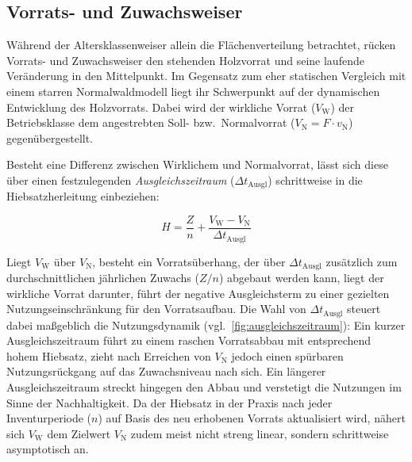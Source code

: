 \documentclass[twocolumn, paper=a4, fontsize=10pt]{scrartcl}
\begin{document}
\subsection{Vorrats- und Zuwachsweiser}

Während der Altersklassenweiser allein die Flächenverteilung betrachtet, rücken Vorrats- und Zuwachsweiser den stehenden Holzvorrat und seine laufende Veränderung in den Mittelpunkt. Im Gegensatz zum eher statischen Vergleich mit einem starren Normalwaldmodell liegt ihr Schwerpunkt auf der dynamischen Entwicklung des Holzvorrats. Dabei wird der wirkliche Vorrat ($V_{\text{W}}$) der Betriebsklasse dem angestrebten Soll- bzw.\ Normalvorrat ($V_{\text{N}} = F \cdot v_{\text{N}}$) gegenübergestellt.

Besteht eine Differenz zwischen Wirklichem und Normalvorrat, lässt sich diese über einen festzulegenden \emph{Ausgleichszeitraum} ($\Delta t_{\text{Ausgl}}$) schrittweise in die Hiebsatzherleitung einbeziehen:

\begin{equation}
    \label{eq:vorratsausgleich}
    H = \frac{Z}{n} + \frac{V_{\text{W}} - V_{\text{N}}}{\Delta t_{\text{Ausgl}}}
\end{equation}

Liegt $V_{\text{W}}$ über $V_{\text{N}}$, besteht ein Vorratsüberhang, der über $\Delta t_{\text{Ausgl}}$ zusätzlich zum durchschnittlichen jährlichen Zuwachs ($Z/n$) abgebaut werden kann, liegt der wirkliche Vorrat darunter, führt der negative Ausgleichsterm zu einer gezielten Nutzungseinschränkung für den Vorratsaufbau. Die Wahl von $\Delta t_{\text{Ausgl}}$ steuert dabei maßgeblich die Nutzungsdynamik (vgl.\ \cref{fig:ausgleichszeitraum}): Ein kurzer Ausgleichszeitraum führt zu einem raschen Vorratsabbau mit entsprechend hohem Hiebsatz, zieht nach Erreichen von $V_{\text{N}}$ jedoch einen spürbaren Nutzungsrückgang auf das Zuwachsniveau nach sich. Ein längerer Ausgleichszeitraum streckt hingegen den Abbau und verstetigt die Nutzungen im Sinne der Nachhaltigkeit. Da der Hiebsatz in der Praxis nach jeder Inventurperiode ($n$) auf Basis des neu erhobenen Vorrats aktualisiert wird, nähert sich $V_{\text{W}}$ dem Zielwert $V_{\text{N}}$ zudem meist nicht streng linear, sondern schrittweise asymptotisch an.
\end{document}
